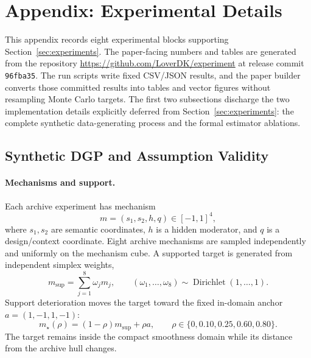 \documentclass[11pt]{article}
\numberwithin{equation}{section}
\newcommand{\1}{\mathbf 1}
\begin{document}
\section{Appendix: Experimental Details}
\label{app:experiments}

This appendix records eight experimental blocks supporting Section~\ref{sec:experiments}.  The paper-facing numbers and tables are generated from the repository \url{https://github.com/LoverDK/experiment} at release commit \texttt{96fba35}.  The run scripts write fixed CSV/JSON results, and the paper builder converts those committed results into tables and vector figures without resampling Monte Carlo targets.  The first two subsections discharge the two implementation details explicitly deferred from Section~\ref{sec:experiments}: the complete synthetic data-generating process and the formal estimator ablations.

\subsection{Synthetic DGP and Assumption Validity}
\label{app:synthetic-dgp}
\suppressfloats[t]

\paragraph{Mechanisms and support.}
Each archive experiment has mechanism
\[
  m=(s_1,s_2,h,q)\in[-1,1]^4,
\]
where $s_1,s_2$ are semantic coordinates, $h$ is a hidden moderator, and $q$ is a design/context coordinate.  Eight archive mechanisms are sampled independently and uniformly on the mechanism cube.  A supported target is generated from independent simplex weights,
\[
  m_{\mathrm{sup}}=\sum_{j=1}^{8}\omega_jm_j,
  \qquad
  (\omega_1,\ldots,\omega_8)\sim\operatorname{Dirichlet}(1,\ldots,1).
\]
Support deterioration moves the target toward the fixed in-domain anchor $a=(1,-1,1,-1)$:
\[
  m_\star(\rho)=(1-\rho)m_{\mathrm{sup}}+\rho a,
  \qquad \rho\in\{0,0.10,0.25,0.60,0.80\}.
\]
The target remains inside the compact smoothness domain while its distance from the archive hull changes.
\end{document}
